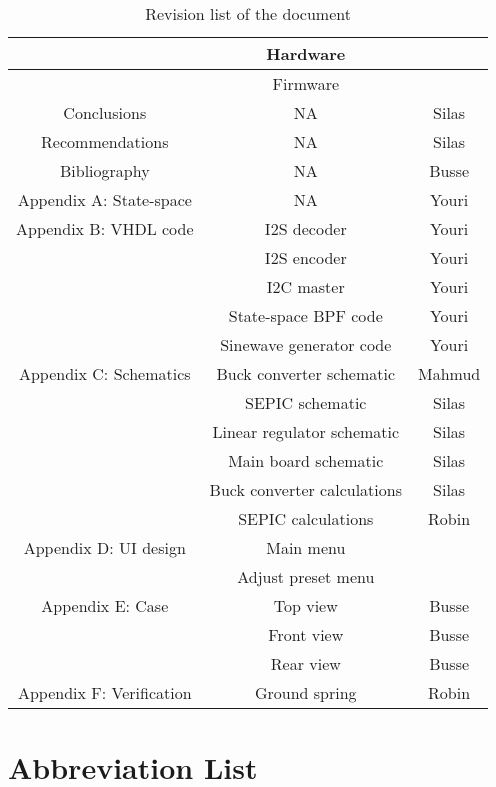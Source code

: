 \begin{justify}
\begin{table}[!h]
\begin{tabular}{|c|c|c|}
							& Hardware						& 					\\ \hline
							& Firmware						& 					\\ \hline
Conclusions					& NA							& Silas				\\ \hline
Recommendations				& NA							& Silas				\\ \hline
Bibliography				& NA							& Busse				\\ \hline
Appendix A: State-space		& NA							& Youri				\\ \hline
Appendix B: VHDL code		& I2S decoder					& Youri				\\ \hline
							& I2S encoder					& Youri				\\ \hline
							& I2C master					& Youri				\\ \hline
							& State-space BPF code			& Youri				\\ \hline
							& Sinewave generator code		& Youri				\\ \hline
Appendix C: Schematics		& Buck converter schematic		& Mahmud			\\ \hline
							& SEPIC schematic				& Silas				\\ \hline
							& Linear regulator schematic	& Silas				\\ \hline
							& Main board schematic			& Silas				\\ \hline
							& Buck converter calculations	& Silas				\\ \hline
							& SEPIC calculations			& Robin				\\ \hline
Appendix D: UI design		& Main menu						& 					\\ \hline
							& Adjust preset menu			& 					\\ \hline
Appendix E: Case			& Top view						& Busse				\\ \hline
							& Front view					& Busse				\\ \hline
							& Rear view						& Busse				\\ \hline
Appendix F: Verification	& Ground spring					& Robin				\\ \hline

\end{tabular}
\caption{Revision list of the document}
\label{Revision history}
\end{table}

\newpage
\pagestyle{plain}
\setcounter{page}{1}

\chapter*{Abbreviation List}


\end{justify}
